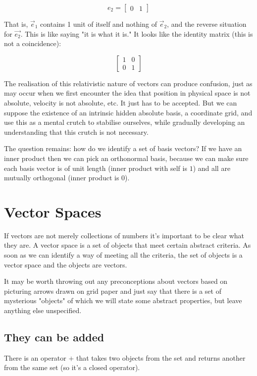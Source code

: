 $$e_2 = \begin{bmatrix}0 & 1\end{bmatrix}$$

That is, $\vec{e}_1$ contains 1 unit of itself and nothing of $\vec{e}_2$, and the reverse situation for $\vec{e_2}$. This is like saying "it is what it is." It looks like the identity matrix (this is not a coincidence):

$$
\begin{bmatrix}1 & 0 \\ 0 & 1\end{bmatrix}
$$

The realisation of this relativistic nature of vectors can produce confusion, just as may occur when we first encounter the idea that position in physical space is not absolute, velocity is not absolute, etc. It just has to be accepted. But we can suppose the existence of an intrinsic hidden absolute basis, a coordinate grid, and use this as a mental crutch to stabilise ourselves, while gradually developing an understanding that this crutch is not necessary.

The question remains: how do we identify a set of basis vectors? If we have an inner product then we can pick an orthonormal basis, because we can make sure each basis vector is of unit length (inner product with self is $1$) and all are mutually orthogonal (inner product is $0$).

\section{Vector Spaces}

If vectors are not merely collections of numbers it's important to be clear what they are. A vector space is a set of objects that meet certain abstract criteria. As soon as we can identify a way of meeting all the criteria, the set of objects is a vector space and the objects are vectors.

It may be worth throwing out any preconceptions about vectors based on picturing arrows drawn on grid paper and just say that there is a set of mysterious "objects" of which we will state some abstract properties, but leave anything else unspecified.

\subsection{They can be added}

There is an operator $+$ that takes two objects from the set and returns another from the same set (so it's a closed operator).

